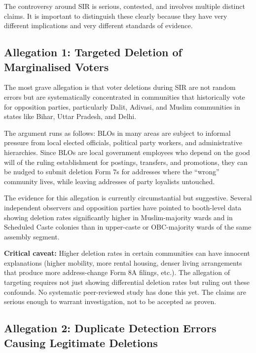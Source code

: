 \documentclass[11pt, a4paper]{article}
\begin{document}
The controversy around SIR is serious, contested, and involves multiple distinct claims. It is important to distinguish these clearly because they have very different implications and very different standards of evidence.

\subsection{Allegation 1: Targeted Deletion of Marginalised Voters}

The most grave allegation is that voter deletions during SIR are not random errors but are systematically concentrated in communities that historically vote for opposition parties, particularly Dalit, Adivasi, and Muslim communities in states like Bihar, Uttar Pradesh, and Delhi.

The argument runs as follows: BLOs in many areas are subject to informal pressure from local elected officials, political party workers, and administrative hierarchies. Since BLOs are local government employees who depend on the good will of the ruling establishment for postings, transfers, and promotions, they can be nudged to submit deletion Form 7s for addresses where the ``wrong'' community lives, while leaving addresses of party loyalists untouched.

The evidence for this allegation is currently circumstantial but suggestive. Several independent observers and opposition parties have pointed to booth-level data showing deletion rates significantly higher in Muslim-majority wards and in Scheduled Caste colonies than in upper-caste or OBC-majority wards of the same assembly segment.

\begin{tcolorbox}[colback=alertred!6, colframe=alertred, sharp corners, boxrule=0.6pt]
\textbf{Critical caveat:} Higher deletion rates in certain communities can have innocent explanations (higher mobility, more rental housing, denser living arrangements that produce more address-change Form 8A filings, etc.). The allegation of targeting requires not just showing differential deletion rates but ruling out these confounds. No systematic peer-reviewed study has done this yet. The claims are serious enough to warrant investigation, not to be accepted as proven.
\end{tcolorbox}

\subsection{Allegation 2: Duplicate Detection Errors Causing Legitimate Deletions}
\end{document}
